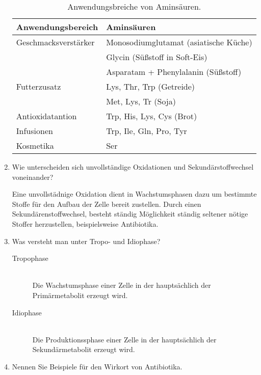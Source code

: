 \begin{enumerate}
		\begin{table}[h!]
		\begin{center}
		\begin{tabular}{l l} 
		\toprule
			Anwendungsbereich	&	Aminsäuren \\
			\midrule
			Geschmacksverstärker	&	Monosodiumglutamat \hfill (asiatische Küche)\\
			\multirow{2}{*}{}		&	Glycin \hfill (Süßstoff in Soft-Eis)\\
										&	Asparatam + Phenylalanin \hfill (Süßstoff)\\
			Futterzusatz			&	Lys, Thr, Trp \hfill	(Getreide) \\
										&	Met, Lys, Tr \hfill(Soja) \\
			Antioxidatantion		&	Trp, His, Lys, Cys \hfill (Brot) \\
			Infusionen				&	Trp, Ile, Gln, Pro, Tyr \\
			Kosmetika				& 	Ser \\
		\bottomrule
		\end{tabular}
		\label{tab:anwenungAS}
		\caption{Anwendungsbreiche von Aminsäuren.}
		\end{center}
		\end{table}

	\item Wie unterscheiden sich unvollständige Oxidationen und Sekundärstoffwechsel voneinander?
		
		Eine unvollstädnige Oxidation dient in Wachstumsphasen dazu um bestimmte Stoffe für den
		Aufbau der Zelle bereit zustellen.
		Durch einen Sekundärenstoffwechsel,
		besteht ständig Möglichkeit ständig seltener nötige Stoffer herzustellen,
		beispielsweise Antibiotika.

	\item Was versteht man unter Tropo- und Idiophase?
		
		\begin{description}
			\item[Tropophase] \hfill \\
				Die Wachstumsphase einer Zelle in der hauptsächlich der Primärmetabolit erzeugt wird.
			\item[Idiophase] \hfill \\
				Die Produktionssphase einer Zelle in der hauptsächlich der Sekundärmetabolit erzeugt wird.
		\end{description}

	\item Nennen Sie Beispiele für den Wirkort von Antibiotika.


\end{enumerate}
